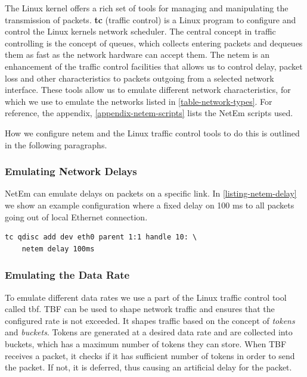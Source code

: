 The Linux kernel offers a rich set of tools for managing and manipulating the
transmission of packets. \textbf{tc} (traffic control) is a Linux program to
configure and control the Linux kernels network scheduler. The central concept
in traffic controlling is the concept of queues, which collects entering packets
and dequeues them as fast as the network hardware can accept them. The
\gls{netem} is an enhancement of the traffic control facilities that allows us
to control delay, packet loss and other characteristics to packets outgoing from
a selected network interface\cite{man-netem}. These tools allow us to emulate
different network characteristics, for which we use to emulate the networks listed
in \cref{table-network-types}. For reference, the
appendix, \cref{appendix-netem-scripts} lists the NetEm scripts used.

How we configure \gls{netem} and the Linux traffic control tools to do this is
outlined in the following paragraphs.


\subsubsection{Emulating Network Delays}

NetEm can emulate delays on packets on a specific link. In
\cref{listing-netem-delay} we show an example configuration where a fixed delay
on 100 ms to all packets going out of local Ethernet connection.

\begin{lstlisting}[frame=single, caption="Emulating delay", label=listing-netem-delay]
  tc qdisc add dev eth0 parent 1:1 handle 10: \
    netem delay 100ms
\end{lstlisting}

\subsubsection{Emulating the Data Rate}

To emulate different data rates we use a part of the Linux traffic control tool
called \gls{tbf}. TBF can be used to shape network traffic and ensures that the
configured rate is not exceeded. It shapes traffic based on the concept of
\textit{tokens} and \textit{buckets}. Tokens are generated at a desired data
rate and are collected into buckets, which has a maximum number of tokens they
can store. When TBF receives a packet, it checks if it has sufficient number of
tokens in order to send the packet. If not, it is deferred, thus causing an
artificial delay for the packet.


